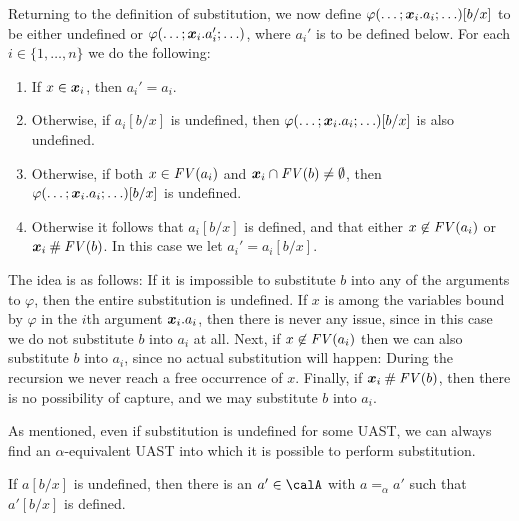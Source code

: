 \documentclass[a4paper, 11pt, article, danish, oneside]{memoir}
\DeclarePairedDelimiter{\auxdelimparen}{(}{)}
\newcommand*\intersect\cap
\renewcommand{\phi}{\varphi}
\newcommand{\freevar}[2][]{\mathit{FV}\auxdelimparen[#1]{#2}}
\begin{document}
Returning to the definition of substitution, we now define $\phi(\ldots ; \seq{x}_i.a_i ; \ldots)[b/x]$ to be either undefined or $\phi(\ldots ; \seq{x}_i.a_i' ; \ldots)$, where $a_i'$ is to be defined below. For each $i \in \{1, \ldots, n\}$ we do the following:
%
\begin{enumerate}
    \item If $x \in \bm{x}_i$, then $a_i' = a_i$.

    \item Otherwise, if $a_i[b/x]$ is undefined, then $\phi(\ldots ; \seq{x}_i.a_i ; \ldots)[b/x]$ is also undefined.

    \item Otherwise, if both $x \in \freevar{a_i}$ and $\seq{x}_i \intersect \freevar{b} \neq \emptyset$, then $\phi(\ldots ; \seq{x}_i.a_i ; \ldots)[b/x]$ is undefined.

    \item Otherwise it follows that $a_i[b/x]$ is defined, and that either $x \not\in \freevar{a_i}$ or $\seq{x}_i \disj \freevar{b}$. In this case we let $a_i' = a_i[b/x]$.
\end{enumerate}
%
The idea is as follows: If it is impossible to substitute $b$ into any of the arguments to $\phi$, then the entire substitution is undefined. If $x$ is among the variables bound by $\phi$ in the $i$th argument $\bm{x}_i.a_i$, then there is never any issue, since in this case we do not substitute $b$ into $a_i$ at all. Next, if $x \not\in \freevar{a_i}$ then we can also substitute $b$ into $a_i$, since no actual substitution will happen: During the recursion we never reach a free occurrence of $x$. Finally, if $\seq{x}_i \disj \freevar{b}$, then there is no possibility of capture, and we may substitute $b$ into $a_i$.

As mentioned, even if substitution is undefined for some UAST, we can always find an $\alpha$-equivalent UAST into which it is possible to perform substitution.

\begin{lemma}
    \label{lem:substitution-alpha-defined}
    If $a[b/x]$ is undefined, then there is an $a' \in \calA$ with $a =_\alpha a'$ such that $a'[b/x]$ is defined.
\end{lemma}
\end{document}
